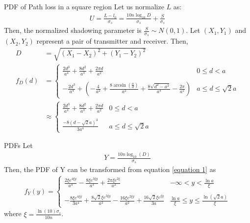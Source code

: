 \documentclass{beamer}
\providecommand{\brak}[1]{\ensuremath{\left(#1\right)}}
\begin{document}
\begin{frame}{PDF of Path loss in a square region}
Let us normalize $L$ as: 
\begin{align}
    U = \frac{L-l_0}{\sigma_s} = \frac{10n\log_{10}D}{\sigma_s} + \frac{S}{\sigma_s}
\end{align}
Then, the normalized shadowing parameter is $\frac{S}{\sigma_s} \sim N(0,1)$. Let $(X_1, Y_1)$ and $(X_2, Y_2)$ represent a pair of transmitter and receiver. Then,
\begin{align}
    D &= \sqrt{(X_1-X_2)^2 + (Y_1-Y_2)^2}
    \\f_D(d) &= \begin{cases}
    \frac{2d^3}{a^4} + \frac{8d^2}{a^3} + \frac{2\pi d}{a^2} & 0\leq d<a\\ ~\\[-1em]
    -\frac{2d^3}{a^4}+ \brak{-\frac{4}{a^2} + \frac{8\arcsin(\frac{a}{d})}{a^2}+\frac{8\sqrt{d^2-a^2}}{a^3}-\frac{2\pi}{a^2}} & a\leq d \leq \sqrt{2}a
        \end{cases}
    \\&\approx \begin{cases}
    \frac{2d^3}{a^4} + \frac{8d^2}{a^3} + \frac{2\pi d}{a^2} & 0\leq d<a\\ ~\\[-1em]
    \frac{-8(d-\sqrt{2}a)^3}{3a^4} & a\leq d \leq \sqrt{2}a
    \end{cases} \label{equation 1}
\end{align}
\end{frame}
\begin{frame}{PDFs}
Let   
\begin{align}
    Y = \frac{10n\log_{10}(D)}{\sigma_s}
\end{align}
Then, the PDF of Y can be transformed from equation \eqref{equation 1} as
\begin{align}
    f_Y(y) = \begin{cases}
    \frac{2\xi e^{4\xi y}}{a^4} - \frac{8\xi e^{3\xi y}}{a^3} + \frac{2\pi \xi e^{2\xi }}{a^2} & -\infty < y < \frac{\ln{a}}{\xi}\\ ~\\[-1em]
    -\frac{8\xi e^{4\xi y}}{3a^4}+ \frac{8\sqrt{2}\xi e^{3\xi y}}{a^3} - \frac{16\xi e^{2\xi y}}{a^2} + \frac{16\sqrt{2}\xi e^{\xi y}}{3a} & \frac{\ln{a}}{\xi} \leq y \leq \frac{\ln{(\sqrt{2}a)}}{\xi}
        \end{cases}
\end{align}
where $\xi = \frac{\ln{(10)}\sigma_s}{10n}$. 
\end{frame}
\end{document}
